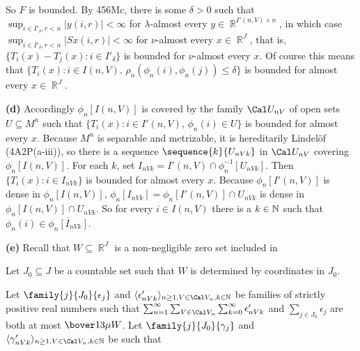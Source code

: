{So $F$ is bounded.   By 456Mc, there is some $\delta>0$ such that
$\sup_{i\in I'_{\delta},r<n}|y(i,r)|<\infty$ for $\lambda$-almost every
$y\in\BbbR^{I'(n,V)\times n}$, in which case
$\sup_{i\in I'_{\delta},r<n}|Sx(i,r)|<\infty$ for $\nu$-almost every
$x\in\BbbR^J$, that is,
$\{T_i(x)-T_j(x):i\in I'_{\delta}\}$ is bounded for $\nu$-almost every
$x$.   Of course this means that
$\{T_i(x):i\in I(n,V),\,\rho_n(\phi_n(i),\phi_n(j))\le\delta\}$ is
bounded for almost every $x\in\BbbR^J$.\ \Qed

\medskip

{\bf (d)} Accordingly $\phi_n[I(n,V)]$ is covered by the family
$\Cal U_{nV}$ of open sets $U\subseteq M^n$ such that
$\{T_i(x):i\in I'(n,V)$, $\phi_n(i)\in U\}$ is bounded for almost every
$x$.   Because $M^n$ is separable and metrizable, it is
hereditarily Lindel\"of (4A2P(a-iii)), so there is a sequence
$\sequence{k}{U_{nVk}}$ in $\Cal U_{nV}$ covering $\phi_n[I(n,V)]$.
For each $k$, set
$I_{nVk}=I'(n,V)\cap\phi_n^{-1}[U_{nVk}]$.   Then
$\{T_i(x):i\in I_{nVk}\}$
is bounded for almost every $x$.  Because $\phi_n[I'(n,V)]$ is dense in
$\phi_n[I(n,V)]$, $\phi_n[I_{nVk}]=\phi_n[I'(n,V)]\cap U_{nVk}$ is dense
in $\phi_n[I(n,V)]\cap U_{nVk}$.
So for every $i\in I(n,V)$ there is a
$k\in\Bbb N$ such that $\phi_n(i)\in\overline{\phi_n[I_{nVk}]}$.


{\bf (e)} Recall that $W\subseteq\BbbR^J$ is a non-negligible zero set
included in


\noindent Let $J_0\subseteq J$ be a countable set such that $W$ is
determined by coordinates in $J_0$.

\ifdim\pagewidth>467pt\fontdimen3\tenrm=2pt\fi
\ifdim\pagewidth>467pt\fontdimen4\tenrm=1.67pt\fi
Let $\family{j}{J_0}{\epsilon_j}$ and 
$\langle\epsilon'_{nVk}\rangle_{n\ge 1,V\in\Cal V_n,k\in\Bbb N}$ 
be families of strictly positive real numbers such that
$\sum_{n=1}^{\infty}\sum_{V\in\Cal V_n}
\sum_{k=0}^{\infty}\epsilon'_{nVk}$
and $\sum_{j\in J_0}\epsilon_j$
are both at most $\bover13\mu W$.   Let $\family{j}{J_0}{\gamma_j}$
and $\langle\gamma'_{nVk}\rangle_{n\ge 1,V\in\Cal V_n,k\in\Bbb N}$ be
such that
\tenrm=1.67pt
\tenrm=1.11pt


}
